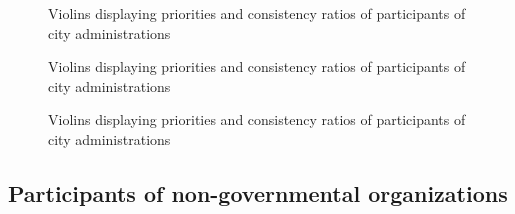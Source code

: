 \documentclass [oneside,10pt,a4paper,ngerman,BCOR10mm,headsepline,parindent,final]{scrartcl}
\begin{document}
    \begin{figure}
        \begin{center}\end{center}
        \caption{Violins displaying priorities and consistency ratios of participants of city administrations}
        \label{fig:violins_all_attributes}
    \end{figure}
    
    \begin{figure}
        \begin{center}\end{center}
        \caption{Violins displaying priorities and consistency ratios of participants of city administrations}
        \label{fig:violins_all_attributes}
    \end{figure}
    
    \begin{figure}
        \begin{center}\end{center}
        \caption{Violins displaying priorities and consistency ratios of participants of city administrations}
        \label{fig:violins_all_attributes}
    \end{figure}
    
    \hypertarget{participants-of-non-governmental-organizations}{%
\subsection{Participants of non-governmental
organizations}\label{participants-of-non-governmental-organizations}}
\end{document}
